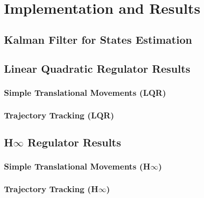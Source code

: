 \chapter{Implementation and Results} \label{ch:implementation}


\section{Kalman Filter for States Estimation}

\section{Linear Quadratic Regulator Results}

\subsection{Simple Translational Movements (LQR)}

\subsection{Trajectory Tracking (LQR)}

\section{H$\infty$ Regulator Results}

\subsection{Simple Translational Movements (H$\infty$)}

\subsection{Trajectory Tracking (H$\infty$)}